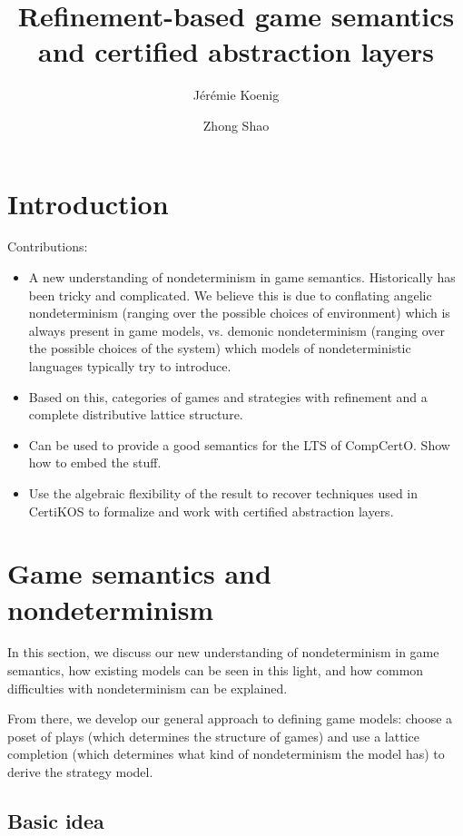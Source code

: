 \documentclass[format=sigplan,authordraft]{acmart}
\title{Refinement-based game semantics and certified abstraction layers} %
\author{J\'er\'emie Koenig}
\affiliation{Yale University}
\author{Zhong Shao}
\affiliation{Yale University}
\begin{document}
\maketitle

\section{Introduction} %

Contributions:
\begin{itemize}
\item A new understanding of nondeterminism in game semantics.
  Historically has been tricky and complicated.
  We believe this is due to conflating
  angelic nondeterminism
  (ranging over the possible choices of environment)
  which is always present in game models,
  vs. demonic nondeterminism
  (ranging over the possible choices of the system)
  which models of nondeterministic languages
  typically try to introduce.
\item Based on this,
  categories of games and strategies
  with refinement and a complete distributive lattice structure.
\item Can be used to provide a good semantics
  for the LTS of CompCertO.
  Show how to embed the stuff.
\item Use the algebraic flexibility of the result
  to recover techniques used in CertiKOS
  to formalize and work with
  certified abstraction layers.
\end{itemize}


\section{Game semantics and nondeterminism} %

In this section,
we discuss our new understanding of
nondeterminism in game semantics,
how existing models can be seen in this light,
and how common difficulties
with nondeterminism can be explained.

From there,
we develop our general approach
to defining game models:
choose a poset of plays
(which determines the structure of games)
and use a lattice completion
(which determines what kind of nondeterminism
the model has)
to derive the strategy model.

\subsection{Basic idea} %
\end{document}
